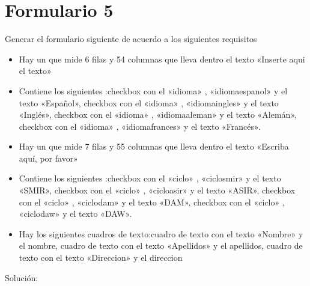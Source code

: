 \documentclass[letterpaper,10pt,spanish]{sphinxmanual}
\begin{document}
\section{Formulario 5}
\label{\detokenize{ejercicios/formularios/anexo_formularios:formulario-5}}
Generar el formulario siguiente de acuerdo a los siguientes requisitos
\begin{itemize}
\item {} 
Hay un  que mide 6 filas y 54 columnas que lleva dentro el texto «Inserte aqui el texto»

\item {} 
Contiene los siguientes :checkbox con el   «idioma» ,   «idiomaespanol»  y el texto «Español», checkbox con el   «idioma» ,   «idiomaingles»  y el texto «Inglés», checkbox con el   «idioma» ,   «idiomaaleman»  y el texto «Alemán», checkbox con el   «idioma» ,   «idiomafrances»  y el texto «Francés».

\item {} 
Hay un  que mide 7 filas y 55 columnas que lleva dentro el texto «Escriba aquí, por favor»

\item {} 
Contiene los siguientes :checkbox con el   «ciclo» ,   «ciclosmir»  y el texto «SMIR», checkbox con el   «ciclo» ,   «cicloasir»  y el texto «ASIR», checkbox con el   «ciclo» ,   «ciclodam»  y el texto «DAM», checkbox con el   «ciclo» ,   «ciclodaw»  y el texto «DAW».

\item {} 
Hay los siguientes cuadros de texto:cuadro de texto con el texto «Nombre» y el  nombre, cuadro de texto con el texto «Apellidos» y el  apellidos, cuadro de texto con el texto «Direccion» y el  direccion

\end{itemize}


Solución:
\end{document}
